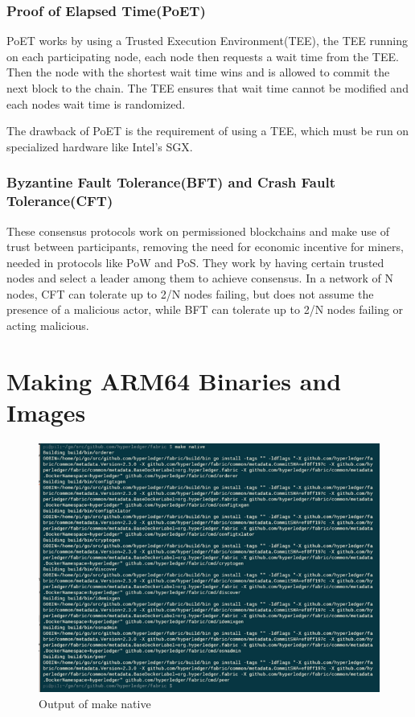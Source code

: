 \subsubsection{Proof of Elapsed Time(PoET)}
PoET works by using a Trusted Execution Environment(TEE), the TEE running on each participating node, each node then requests a wait time from the TEE. Then the node with the shortest wait time wins and is allowed to commit the next block to the chain. The TEE ensures that wait time cannot be modified and each nodes wait time is randomized. 

The drawback of PoET is the requirement of using a TEE, which must be run on specialized hardware like Intel's SGX.\cite{Linux2018Intro}

\subsubsection{Byzantine Fault Tolerance(BFT) and Crash Fault Tolerance(CFT)}
These consensus protocols work on permissioned blockchains and make use of trust between participants, removing the need for economic incentive for miners, needed in protocols like PoW and PoS. They work by having certain trusted nodes and select a leader among them to achieve consensus. In a network of N nodes, CFT can tolerate up to 2/N nodes failing, but does not assume the presence of a malicious actor, while BFT can tolerate up to 2/N nodes failing or acting malicious.

\section{Making ARM64 Binaries and Images}

\begin{figure}
    \centering
    \includegraphics{images/makenative.png}
    \caption{Output of make native}
    \label{fig:my_label}
\end{figure}


